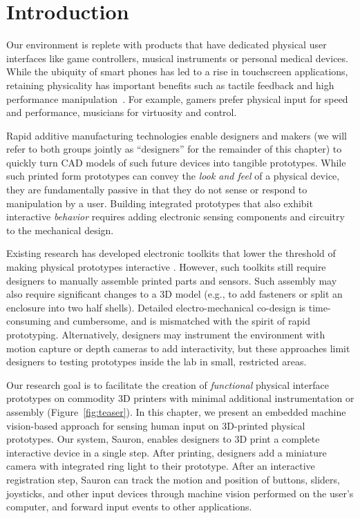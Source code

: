 \section{Introduction}

Our environment is replete with products that have dedicated physical user interfaces like game controllers, musical instruments or personal medical devices. While the ubiquity of smart phones has led to a rise in touchscreen applications, retaining physicality has important benefits such as tactile feedback and high performance manipulation~\cite{klemmer-bodies}. For example, gamers prefer physical input for speed and performance, musicians for virtuosity and control.

Rapid additive manufacturing technologies enable designers and makers (we will refer to both groups jointly as ``designers'' for the remainder of this chapter) to quickly turn CAD models of such future devices into tangible prototypes. While such printed form prototypes can convey the {\em look and feel} of a physical device, they are fundamentally passive in that they do not sense or respond to manipulation by a user. Building integrated prototypes that also exhibit interactive {\em behavior} requires adding electronic sensing components and circuitry to the mechanical design. 

Existing research has developed electronic toolkits that lower the threshold of making physical prototypes interactive \cite{arduino, greenberg-phidgets, hartmann-dtools}.
However, such toolkits still require designers to manually assemble printed parts and sensors. Such assembly may also require significant changes to a 3D model (e.g., to add fasteners or split an enclosure into two half shells). Detailed electro-mechanical co-design is time-consuming and cumbersome, and is mismatched with the spirit of rapid prototyping. Alternatively, designers may instrument the environment with motion capture \cite{akaoka-displayobjects} or depth cameras \cite{wilson-depthtouch} to add interactivity, but these approaches limit designers to testing prototypes inside the lab in small, restricted areas.

Our research goal is to facilitate the creation of \emph{functional} physical interface prototypes on commodity 3D printers with minimal additional instrumentation or assembly (Figure~\ref{fig:teaser}). In this chapter, we present an embedded machine vision-based approach for sensing human input on 3D-printed physical prototypes. Our system, Sauron, enables designers to 3D print a complete interactive device in a single step. After printing, designers add a miniature camera with integrated ring light to their prototype. After an interactive registration step, Sauron can track the motion and position of buttons, sliders, joysticks, and other input devices through machine vision performed on the user's computer, and forward input events to other applications.

